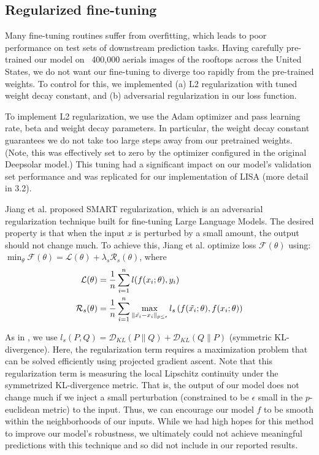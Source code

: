 \documentclass[10pt,twocolumn,letterpaper]{article}
\begin{document}
\subsection{Regularized fine-tuning}
Many fine-tuning routines suffer from overfitting, which leads to poor performance on test sets of downstream prediction tasks. Having carefully pre-trained our model on ~400,000 aerials images of the rooftops across the United States, we do not want our fine-tuning to diverge too rapidly from the pre-trained weights. To control for this, we implemented (a) L2 regularization with tuned weight decay constant, and (b) adversarial regularization in our loss function.

To implement L2 regularization, we use the Adam optimizer and pass learning rate, beta and weight decay parameters. In particular, the weight decay constant guarantees we do not take too large steps away from our pretrained weights. (Note, this was effectively set to zero by the optimizer configured in the original Deepsolar model.) This tuning had a significant impact on our model's validation set performance and was replicated for our implementation of LISA (more detail in 3.2).

Jiang et al. proposed SMART regularization, which is an adversarial regularization technique built for fine-tuning Large Language Models. The desired property is that when the input $x$ is perturbed by a small amount, the output should not change much. To achieve this, Jiang et al. \cite{smart} optimize loss $\mathcal{F}(\theta)$ using: $\min_{\theta} \mathcal{F}(\theta) = \mathcal{L}(\theta) + \lambda_{s}\mathcal{R}_{s}(\theta)$, where
\begin{align*}
\mathcal{L}(\theta) & = \frac{1}{n} \sum_{i=1}^{n} l(f(x_{i};\theta), y_{i})  \\
\mathcal{R}_{s}(\theta) & = \frac{1}{n} \sum_{i=1}^{n} \max_{\lVert \Tilde{x_{i}} - x_{i} \rVert_{p \leq \epsilon}} l_{s}\left(f(\Tilde{x_{i}}; \theta), f(x_{i}; \theta)\right) \\
\end{align*} 

As in \cite{smart}, we use $l_{s}(P, Q) = \mathcal{D}_{KL}(P \lVert Q) + \mathcal{D}_{KL}(Q \lVert P)$ (symmetric KL-divergence). Here, the regularization term requires a maximization problem that can be solved efficiently using projected gradient ascent. Note that this regularization term is measuring the local Lipschitz continuity under the symmetrized KL-divergence metric. That is, the output of our model does not change much if we inject a small perturbation (constrained to be $\epsilon$ small in the $p$-euclidean metric) to the input. Thus, we can encourage our model $f$ to be smooth within the neighborhoods of our inputs. While we had high hopes for this method to improve our model's robustness, we ultimately could not achieve meaningful predictions with this technique and so did not include in our reported results. 
\end{document}
